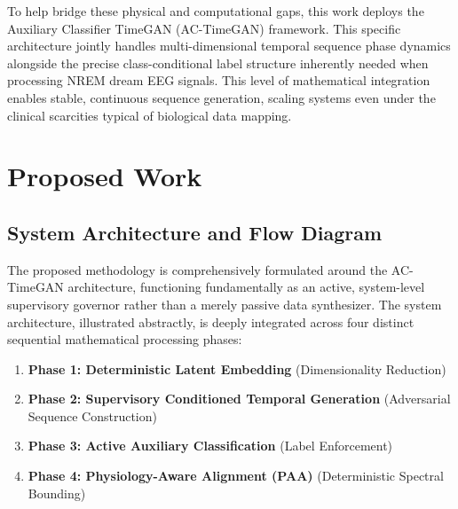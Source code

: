 \documentclass[journal,10pt,twocolumn]{IEEEtran}
\begin{document}
To help bridge these physical and computational gaps, this work deploys the Auxiliary Classifier TimeGAN (AC-TimeGAN) framework. This specific architecture jointly handles multi-dimensional temporal sequence phase dynamics alongside the precise class-conditional label structure inherently needed when processing NREM dream EEG signals. This level of mathematical integration enables stable, continuous sequence generation, scaling systems even under the clinical scarcities typical of biological data mapping.

\section{Proposed Work}

\subsection{System Architecture and Flow Diagram}
The proposed methodology is comprehensively formulated around the AC-TimeGAN architecture, functioning fundamentally as an active, system-level supervisory governor rather than a merely passive data synthesizer. The system architecture, illustrated abstractly, is deeply integrated across four distinct sequential mathematical processing phases: 

\begin{enumerate}
    \item \textbf{Phase 1: Deterministic Latent Embedding} (Dimensionality Reduction)
    \item \textbf{Phase 2: Supervisory Conditioned Temporal Generation} (Adversarial Sequence Construction)
    \item \textbf{Phase 3: Active Auxiliary Classification} (Label Enforcement)
    \item \textbf{Phase 4: Physiology-Aware Alignment (PAA)} (Deterministic Spectral Bounding)
\end{enumerate}
\end{document}
